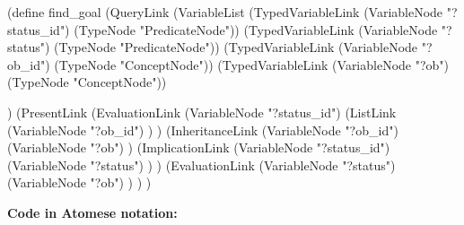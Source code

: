 \begin{python}
(define find_goal
  (QueryLink
    (VariableList
      (TypedVariableLink 
        (VariableNode "?status_id") 
        (TypeNode "PredicateNode"))
      (TypedVariableLink 
        (VariableNode "?status") 
        (TypeNode "PredicateNode"))
      (TypedVariableLink 
        (VariableNode "?ob_id") 
        (TypeNode "ConceptNode"))
      (TypedVariableLink 
        (VariableNode "?ob") 
        (TypeNode "ConceptNode"))
  
    )
    (PresentLink
      (EvaluationLink
        (VariableNode "?status_id")
        (ListLink
          (VariableNode "?ob_id")
        )
      )
      (InheritanceLink
        (VariableNode "?ob_id")
        (VariableNode "?ob")
      )
      (ImplicationLink
        (VariableNode "?status_id")
        (VariableNode "?status")
      )
    )
    (EvaluationLink
      (VariableNode "?status")
      (VariableNode "?ob")
    )
  )
)
\end{python}

\bigskip

\begin{footnotesize}
\textbf{Code in Atomese notation:} \\
\end{footnotesize}

